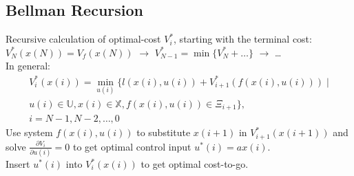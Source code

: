 \documentclass[english]{latex4ei/latex4ei_sheet}
\begin{document}
\begin{sectionbox}
\subsection{Bellman Recursion}
Recursive calculation of optimal-cost $V_i^*$, starting with the terminal cost: \\
$V_{N}^{*}(x(N))=V_f(x(N))$ \; $\rightarrow$ \; $V_{N-1}^{*}=\min\{V^{*}_N+\ldots\}$ \; $\rightarrow$ \;\ldots\\
In general:
\begin{multline*}
V_{i}^{*}(x(i))=\min _{u(i)}\Big\{l(x(i), u(i))+V_{i+1}^{*}\left(f(x(i), u(i))\right) \;| \\u(i) \in \mathbb{U}, x(i) \in \mathbb{X}, f(x(i), u(i)) \in \Xi_{i+1}\Big\},\\
i=N-1,N-2,\ldots,0
\end{multline*}
Use system $f(x(i),u(i))$ to substitute $x(i+1)$ in $V^{*}_{i+1}(x(i+1))$ and solve $\frac{\partial V_{i}}{\partial u(i)}=0$ to get optimal control input $u^{*}(i)=ax(i)$.\\ Insert $u^{*}(i)$ into $V^{*}_{i}(x(i))$ to get optimal cost-to-go.

\end{sectionbox}
\end{document}
